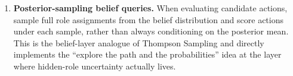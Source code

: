 \documentclass[11pt]{article}
\begin{document}
\begin{enumerate}
  actor-critic). This couples the exploration schedule to the learning signal rather than applying it only at action-selection time.
  \item \textbf{Posterior-sampling belief queries.} When evaluating candidate actions, sample full role assignments from the belief distribution and score actions under each sample, rather than always conditioning on the posterior mean. This is the belief-layer
  analogue of Thompson Sampling and directly implements the ``explore the path and the probabilities'' idea at the layer where hidden-role uncertainty actually lives.
\end{enumerate}

\section*{}
\end{document}
